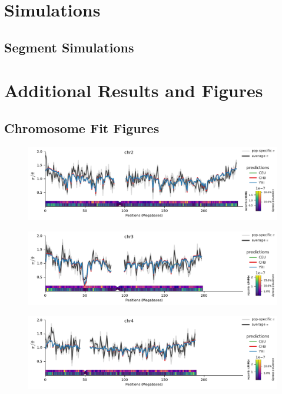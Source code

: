 \documentclass[11pt]{article}
\begin{document}
\section{Simulations}

\subsection{Segment Simulations}

\section{Additional Results and Figures}

\subsection{Chromosome Fit Figures}
\clearpage

\begin{figure}[!htb]
  \centering
  \includegraphics[width=\textwidth]{figures/supplementary/pred_plot_chr2.pdf}
  \label{suppfig:fit-chr1}
\end{figure}


\begin{figure}[!htb]
  \centering
  \includegraphics[width=\textwidth]{figures/supplementary/pred_plot_chr3.pdf}
  \label{suppfig:fit-chr3}
\end{figure}


\begin{figure}[!htb]
  \centering
  \includegraphics[width=\textwidth]{figures/supplementary/pred_plot_chr4.pdf}
  \label{suppfig:fit-chr4}
\end{figure}
\end{document}
